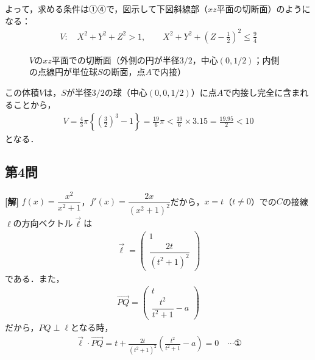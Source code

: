 \documentclass[../main.tex]{subfiles}
\begin{document}
よって，求める条件は①④で，図示して下図斜線部（$xz$平面の切断面）のようになる：
\begin{align*}
  V:\quad X^2+Y^2+Z^2>1,\qquad X^2+Y^2+\left(Z-\frac12\right)^2\le\frac94
\end{align*}

\begin{figure}[htb]
  \centering
  \caption{$V$の$xz$平面での切断面（外側の円が半径$3/2$，中心$(0,1/2)$；内側の点線円が単位球$S$の断面，点$A$で内接）}
\end{figure}

この体積$V$は，$S$が半径$3/2$の球（中心$(0,0,1/2)$）に点$A$で内接し完全に含まれることから，
\begin{align*}
  V=\frac43\pi\left\{\left(\frac32\right)^3-1\right\}=\frac{19}6\pi<\frac{19}6\times3.15=\frac{19.95}2<10
\end{align*}
となる．

\bigskip

\subsection*{第4問}

\noindent
{\bf [解]}
$f(x)=\dfrac{x^2}{x^2+1}$，$f'(x)=\dfrac{2x}{(x^2+1)^2}$だから，$x=t$（$t\ne0$）での$C$の接線$\ell$の方向ベクトル$\vec\ell$は
\begin{align*}
  \vec\ell=
  \begin{pmatrix}1\\\dfrac{2t}{(t^2+1)^2}
  \end{pmatrix}
\end{align*}
である．また，
\begin{align*}
  \overrightarrow{PQ}=
  \begin{pmatrix}t\\\dfrac{t^2}{t^2+1}-a
  \end{pmatrix}
\end{align*}
だから，$PQ\perp\ell$となる時，
\begin{align*}
  \vec\ell\cdot\overrightarrow{PQ}=t+\frac{2t}{(t^2+1)^2}\left(\frac{t^2}{t^2+1}-a\right)=0\quad\cdots①
\end{align*}
\end{document}
